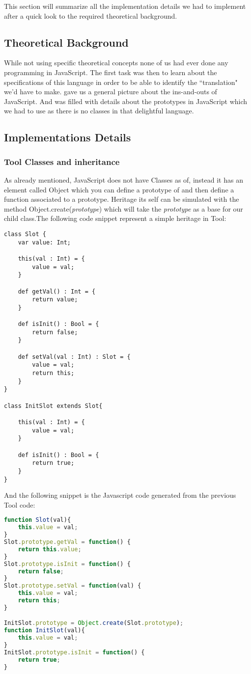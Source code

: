 This section will summarize all the implementation details we had to implement after a quick
look to the required theoretical background.

\subsection{Theoretical Background}
While not using specific theoretical concepts none of us had ever done any programming in JavaScript.
The first task was then to learn about the specifications of this language in order to be able to identify the ``translation" we'd have to make. \cite{JSGood} gave us a general picture about the ins-and-outs of JavaScript.
And \cite{JSProto} was filled with details about the prototypes in JavaScript which we had to use as there is no classes in that delightful language.

\subsection{Implementations Details}
\subsubsection{Tool Classes and inheritance}
As already mentioned, JavaScript does not have Classes as of, instead it has an element called Object which you can define a prototype of and then define a function associated to a prototype. Heritage its self can be simulated with the method Object.create(\emph{prototype}) which will take the \emph{prototype} as a base for our child class.The following code snippet represent a simple heritage in Tool:
\begin{lstlisting}
class Slot {
	var value: Int;

	this(val : Int) = {
		value = val;
	}

	def getVal() : Int = {
		return value;
	}

	def isInit() : Bool = {
		return false;
	}

	def setVal(val : Int) : Slot = {
		value = val;
		return this;
	}
}

class InitSlot extends Slot{

	this(val : Int) = {
		value = val;
	}

	def isInit() : Bool = {
		return true;
	}
}
\end{lstlisting}

And the following snippet is the Javascript code generated from the previous Tool code:
\begin{lstlisting}[language=javascript]
function Slot(val){
    this.value = val;
}
Slot.prototype.getVal = function() {
    return this.value;
}
Slot.prototype.isInit = function() {
    return false;
}
Slot.prototype.setVal = function(val) {
    this.value = val;
    return this;
}

InitSlot.prototype = Object.create(Slot.prototype);
function InitSlot(val){
    this.value = val;
}
InitSlot.prototype.isInit = function() {
    return true;
}

\end{lstlisting}

